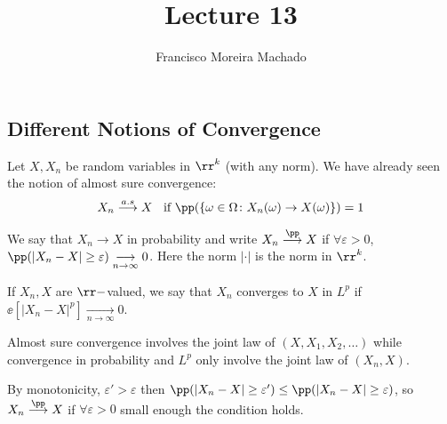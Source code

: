 \documentclass[../main.tex]{subfiles}
\author{Francisco Moreira Machado}
\title{Lecture 13}
\begin{document}
   \subsection{Different Notions of Convergence} 

   Let $X, X_n$ be random variables in $\rr^k$ (with
   any norm). We have already seen the notion of almost sure convergence:
   \[
     X_n \overset{a.s}{\longrightarrow} X \;\;\text{ if } \pp(\{\omega \in \Omega
     \colon X_n(\omega) \to X(\omega) \} ) = 1
   \] 

   \begin{definition}
     We say that $X_n \to X$ in probability and write $X_n
     \overset{\pp}{\longrightarrow} X$ if $\forall \varepsilon>0$, $\pp(|X_n -
     X| \geq \varepsilon) \underset{n \to \infty}{\longrightarrow} 0$.
     Here the norm $|\cdot|$ is the norm in $\rr^k$.

     \vspace{0.2em}

     \noindent
     If $X_n, X$ are $\rr-$valued, we say that $X_n$ converges to $X$ in $L^p$ if 
     $\ee[|X_n-X|^p] \underset{n\to \infty}{\longrightarrow} 0$.
   \end{definition}

   \begin{remark}
     Almost sure convergence involves the joint law of $(X, X_1, X_2, \ldots)$
     while convergence in probability and $L^p$ only involve the joint law of
     $(X_n, X)$.
   \end{remark}

   \begin{remark}
     By monotonicity, $\varepsilon' > \varepsilon$ then $\pp(|X_n - X| \geq
     \varepsilon') \leq \pp(|X_n - X| \geq \varepsilon)$, so $ X_n
     \overset{\pp}{\longrightarrow} X$ if $\forall \varepsilon>0$ small enough
     the condition holds.
   \end{remark}
\end{document}
